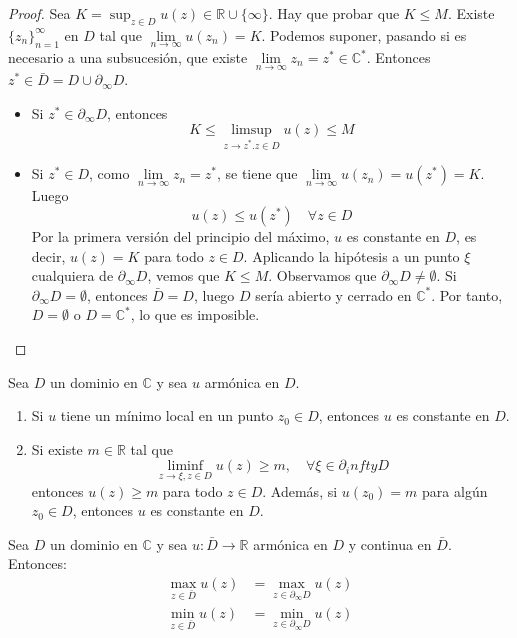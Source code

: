 \begin{proof}
    Sea $K = \sup_{z \in D} u(z) \in \mathbb{R} \cup \{\infty\}$.
    Hay que probar que $K \leq M$.
    Existe $\{z_n\}_{n=1}^\infty$ en $D$ tal que $\lim\limits_{n \to \infty} u(z_n) = K$.
    Podemos suponer, pasando si es necesario a una subsucesión, que existe $\lim\limits_{n \to \infty} z_n = z^\ast \in \mathbb{C}^\ast$.
    Entonces $z^\ast \in \bar{D} = D \cup \partial_\infty D$.
    \begin{itemize}
        \item Si $z^\ast \in \partial_\infty D$, entonces
              $$K \leq \limsup_{z \to z^\ast. z \in D} u(z) \leq M$$
        \item Si $z^\ast \in D$, como $\lim\limits_{n \to \infty} z_n = z^\ast$, se tiene que $\lim\limits_{n \to \infty} u(z_n) = u(z^\ast) = K$.
              Luego
              $$u(z) \leq u(z^\ast) \quad \forall z \in D$$
              Por la primera versión del principio del máximo, $u$ es constante en $D$, es decir, $u(z) = K$ para todo $z \in D$.
              Aplicando la hipótesis a un punto $\xi$ cualquiera de $\partial_\infty D$, vemos que $K \leq M$.
              Observamos que $\partial_\infty D \neq \emptyset$.
              Si $\partial_\infty D = \emptyset$, entonces $\bar{D} = D$, luego $D$ sería abierto y cerrado en $\mathbb{C}^\ast$.
              Por tanto, $D = \emptyset$ o $D = \mathbb{C}^\ast$, lo que es imposible.
    \end{itemize}
\end{proof}

\begin{theorem}
    Sea $D$ un dominio en $\mathbb{C}$ y sea $u$ armónica en $D$.
    \begin{enumerate}
        \item Si $u$ tiene un mínimo local en un punto $z_0 \in D$, entonces $u$ es constante en $D$.
        \item Si existe $m \in \mathbb{R}$ tal que
              $$\liminf_{z \to \xi, z \in D} u(z) \geq m, \quad \forall \xi \in \partial_infty D$$
              entonces $u(z) \geq m$ para todo $z \in D$.
              Además, si $u(z_0) = m$ para algún $z_0 \in D$, entonces $u$ es constante en $D$.
    \end{enumerate}
\end{theorem}

\begin{corollary}
    Sea $D$ un dominio en $\mathbb{C}$ y sea $u: \bar{D} \to \mathbb{R}$ armónica en $D$ y continua en $\bar{D}$.
    Entonces:
    \begin{align*}
        \max_{z \in \bar{D}} u(z) & = \max_{z \in \partial_\infty D} u(z) \\
        \min_{z \in \bar{D}} u(z) & = \min_{z \in \partial_\infty D} u(z)
    \end{align*}
\end{corollary}

